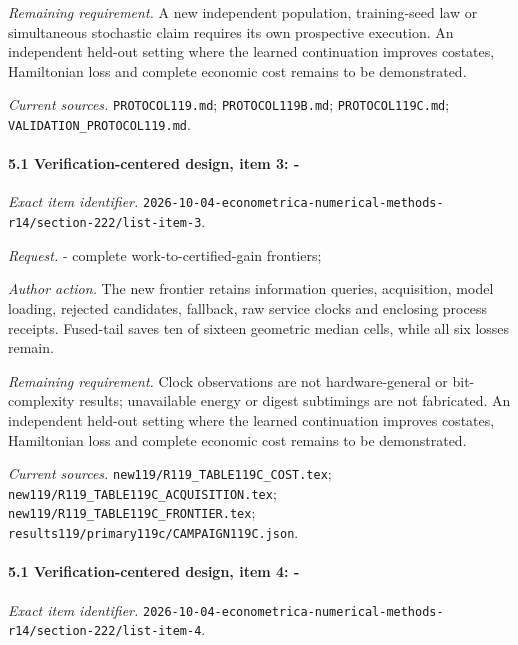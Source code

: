 \par\emph{Remaining requirement.} A new independent population, training-seed law or simultaneous stochastic claim requires its own prospective execution. An independent held-out setting where the learned continuation improves costates, Hamiltonian loss and complete economic cost remains to be demonstrated.

\par\emph{Current sources.} \nolinkurl{PROTOCOL119.md}; \nolinkurl{PROTOCOL119B.md}; \nolinkurl{PROTOCOL119C.md}; \nolinkurl{VALIDATION_PROTOCOL119.md}.

\paragraph{5.1 Verification-centered design, item 3: -}

\emph{Exact item identifier.} \nolinkurl{2026-10-04-econometrica-numerical-methods-r14/section-222/list-item-3}.

\par\emph{Request.} - complete work-to-certified-gain frontiers;

\par\emph{Author action.} The new frontier retains information queries, acquisition, model loading, rejected candidates, fallback, raw service clocks and enclosing process receipts. Fused-tail saves ten of sixteen geometric median cells, while all six losses remain.

\par\emph{Remaining requirement.} Clock observations are not hardware-general or bit-complexity results; unavailable energy or digest subtimings are not fabricated. An independent held-out setting where the learned continuation improves costates, Hamiltonian loss and complete economic cost remains to be demonstrated.

\par\emph{Current sources.} \nolinkurl{new119/R119_TABLE119C_COST.tex}; \nolinkurl{new119/R119_TABLE119C_ACQUISITION.tex}; \nolinkurl{new119/R119_TABLE119C_FRONTIER.tex}; \nolinkurl{results119/primary119c/CAMPAIGN119C.json}.

\paragraph{5.1 Verification-centered design, item 4: -}

\emph{Exact item identifier.} \nolinkurl{2026-10-04-econometrica-numerical-methods-r14/section-222/list-item-4}.

